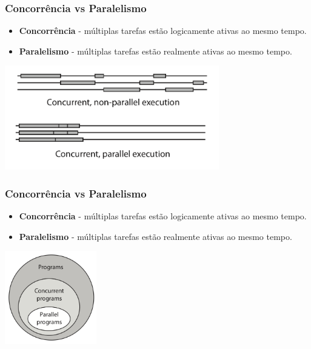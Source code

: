 \documentclass[xcolor={usenames,dvipsnames},12pt,presentation,aspectratio=169]{beamer}
\begin{document}
\begin{frame}
  \frametitle{Concorrência vs Paralelismo}
  \vspace{-4mm}
  \begin{itemize}
    \item \textbf{Concorrência} - múltiplas tarefas estão logicamente ativas ao mesmo tempo.
    \item \textbf{Paralelismo} - múltiplas tarefas estão realmente ativas ao mesmo tempo.
  \end{itemize}
  \begin{center}
	\includegraphics[width=0.7\textwidth]{concorrente1.png}
  \end{center}
\end{frame}
\begin{frame}
  \frametitle{Concorrência vs Paralelismo}
  \vspace{-4mm}
  \begin{itemize}
    \item \textbf{Concorrência} - múltiplas tarefas estão logicamente ativas ao mesmo tempo.
    \item \textbf{Paralelismo} - múltiplas tarefas estão realmente ativas ao mesmo tempo.
  \end{itemize}
  \begin{center}
	\includegraphics[width=0.3\textwidth]{concorrente2.png}
  \end{center}
\end{frame}
\end{document}
